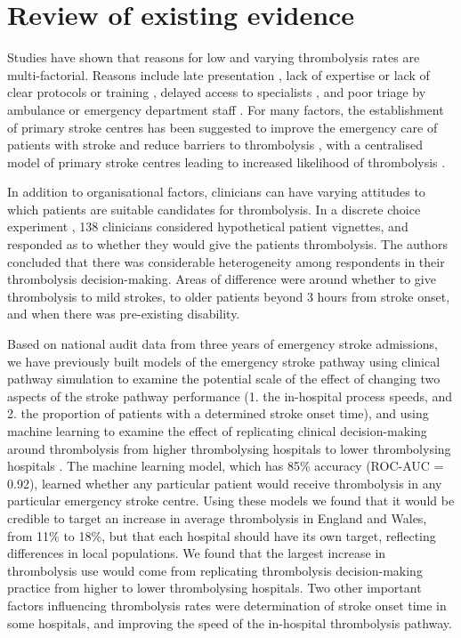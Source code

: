 \section{Review of existing evidence}




Studies have shown that reasons for low and varying thrombolysis rates are multi-factorial. Reasons include late presentation \cite{aguiar_de_sousa_access_2019}, lack of expertise \cite{aguiar_de_sousa_access_2019} or lack of clear protocols or training \cite{carter-jones_stroke_2011}, delayed access to specialists \cite{kamal_delays_2017}, and poor triage by ambulance or emergency department staff \cite{carter-jones_stroke_2011}. For many factors, the establishment of primary stroke centres has been suggested to improve the emergency care of patients with stroke and reduce barriers to thrombolysis \cite{carter-jones_stroke_2011}, with a centralised model of primary stroke centres leading to increased likelihood of thrombolysis \cite{lahr_proportion_2012, morris_impact_2014, hunter_impact_2013}. 

In addition to organisational factors, clinicians can have varying attitudes to which patients are suitable candidates for thrombolysis. In a discrete choice experiment \cite{de_brun_factors_2018}, 138 clinicians considered hypothetical patient vignettes, and responded as to whether they would give the patients thrombolysis. The authors concluded that there was considerable heterogeneity among respondents in their thrombolysis decision-making. Areas of difference were around whether to give thrombolysis to mild strokes, to older patients beyond 3 hours from stroke onset, and when there was pre-existing disability.

Based on national audit data from three years of emergency stroke admissions, we have previously built models of the emergency stroke pathway using clinical pathway simulation to examine the potential scale of the effect of changing two aspects of the stroke pathway performance (1. the in-hospital process speeds, and 2. the proportion of patients with a determined stroke onset time), and using machine learning to examine the effect of replicating clinical decision-making around thrombolysis from higher thrombolysing hospitals to lower thrombolysing hospitals \cite{allen_using_2022, allen_use_2022}. The machine learning model, which has 85\% accuracy (ROC-AUC = 0.92), learned whether any particular patient would receive thrombolysis in any particular emergency stroke centre. Using these models we found that it would be credible to target an increase in average thrombolysis in England and Wales, from 11\% to 18\%, but that each hospital should have its own target, reflecting differences in local populations. We found that the largest increase in thrombolysis use would come from replicating thrombolysis decision-making practice from higher to lower thrombolysing hospitals. Two other important factors influencing thrombolysis rates were determination of stroke onset time in some hospitals, and improving the speed of the in-hospital thrombolysis pathway.

